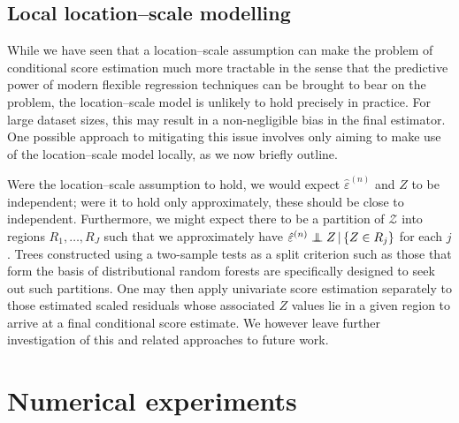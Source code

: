 \documentclass[aos]{imsart}
\newcommand{\given}{\,|\,}
\newcommand{\independent}{\mbox{${}\perp\mkern-11mu\perp{}$}}
\begin{document}
\subsection{Local location--scale modelling} \label{sec:local}
	While we have seen that a location--scale assumption can make the problem of conditional score estimation much more tractable in the sense that the predictive power of modern flexible regression techniques can be brought to bear on the problem, the location--scale model is unlikely to hold precisely in practice. For large dataset sizes, this may result in a non-negligible bias in the final estimator. One possible approach to mitigating this issue involves only aiming to make use of the location--scale model locally, as we now briefly outline.
	
	Were the location--scale assumption to hold, we would expect $\hat{\varepsilon}^{(n)}$ and $Z$ to be independent; were it to hold only approximately, these should be close to independent. Furthermore, we might expect there to be a partition of $\mathcal{Z}$ into regions $R_1,\ldots,R_J$ such that we approximately have $\hat{\varepsilon}^{(n)} \independent Z \given \{Z \in R_j\}$ for each $j$. Trees constructed using a two-sample tests as a split criterion such as those that form the basis of distributional random forests \citep{cevid2022distributional} are specifically designed to seek out such partitions. One may then apply univariate score estimation separately to those estimated scaled residuals whose associated $Z$ values lie in a given region to arrive at a final conditional score estimate. We however leave further investigation of this and related approaches to future work.
	
	\section{Numerical experiments}
	\label{sect:numerical}
	
\end{document}
